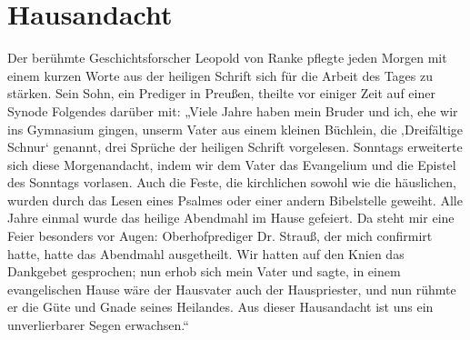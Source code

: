 \chapter[Hausandacht]{Hausandacht}
Der berühmte Geschichtsforscher Leopold von Ranke pflegte jeden Morgen mit einem kurzen Worte aus der heiligen Schrift sich für die Arbeit des Tages zu stärken. Sein Sohn, ein Prediger in Preußen, theilte vor einiger Zeit auf einer Synode Folgendes darüber mit: „Viele Jahre haben mein Bruder und ich, ehe wir ins Gymnasium gingen, unserm Vater aus einem kleinen Büchlein, die ‚Dreifältige Schnur‘ genannt, drei Sprüche der heiligen Schrift vorgelesen. Sonntags erweiterte sich diese Morgenandacht, indem wir dem Vater das Evangelium und die Epistel des Sonntags vorlasen. Auch die Feste, die kirchlichen sowohl wie die häuslichen, wurden durch das Lesen eines Psalmes oder einer andern Bibelstelle geweiht. Alle Jahre einmal wurde das heilige Abendmahl im Hause gefeiert. Da steht mir eine Feier besonders vor Augen: Oberhofprediger Dr. Strauß, der mich confirmirt hatte, hatte das Abendmahl ausgetheilt. Wir hatten auf den Knien das Dankgebet gesprochen; nun erhob sich mein Vater und sagte, in einem evangelischen Hause wäre der Hausvater auch der Hauspriester, und nun rühmte er die Güte und Gnade seines Heilandes. Aus dieser Hausandacht ist uns ein unverlierbarer Segen erwachsen.“
